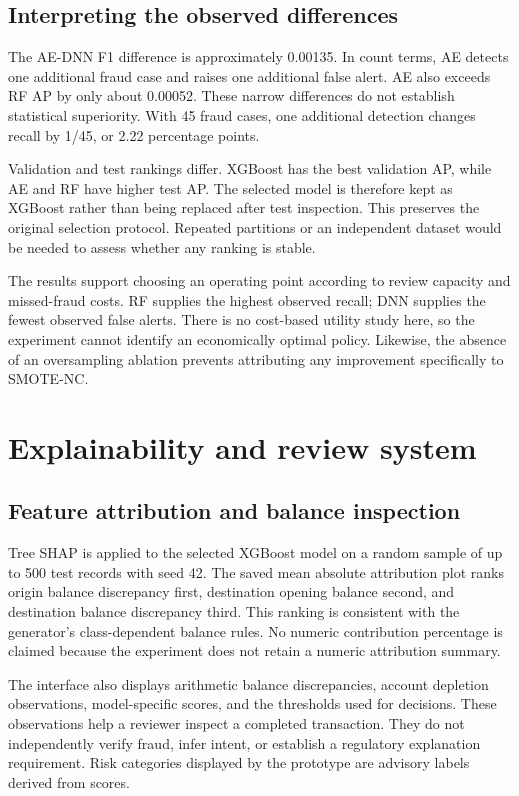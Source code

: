 \documentclass[conference]{IEEEtran}
\begin{document}
\subsection{Interpreting the observed differences}
The AE-DNN F1 difference is approximately 0.00135. In count terms, AE detects one additional fraud case and raises one additional false alert. AE also exceeds RF AP by only about 0.00052. These narrow differences do not establish statistical superiority. With 45 fraud cases, one additional detection changes recall by 1/45, or 2.22 percentage points.

Validation and test rankings differ. XGBoost has the best validation AP, while AE and RF have higher test AP. The selected model is therefore kept as XGBoost rather than being replaced after test inspection. This preserves the original selection protocol. Repeated partitions or an independent dataset would be needed to assess whether any ranking is stable.

The results support choosing an operating point according to review capacity and missed-fraud costs. RF supplies the highest observed recall; DNN supplies the fewest observed false alerts. There is no cost-based utility study here, so the experiment cannot identify an economically optimal policy. Likewise, the absence of an oversampling ablation prevents attributing any improvement specifically to SMOTE-NC.

\section{Explainability and review system}
\subsection{Feature attribution and balance inspection}
Tree SHAP is applied to the selected XGBoost model on a random sample of up to 500 test records with seed 42. The saved mean absolute attribution plot ranks origin balance discrepancy first, destination opening balance second, and destination balance discrepancy third. This ranking is consistent with the generator's class-dependent balance rules. No numeric contribution percentage is claimed because the experiment does not retain a numeric attribution summary.

The interface also displays arithmetic balance discrepancies, account depletion observations, model-specific scores, and the thresholds used for decisions. These observations help a reviewer inspect a completed transaction. They do not independently verify fraud, infer intent, or establish a regulatory explanation requirement. Risk categories displayed by the prototype are advisory labels derived from scores.
\end{document}
